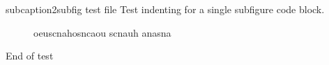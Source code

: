 subcaption2subfig test file
Test indenting for a single subfigure code block.

    \begin{subfigure}
        aoeuscnahosncaou
        scnauh
            anasna
    \end{subfigure}

End of test
